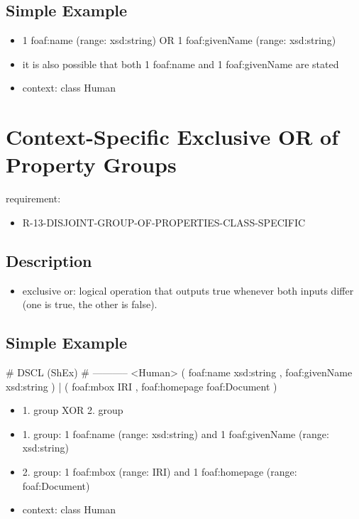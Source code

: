 \documentclass{llncs}
\begin{document}
\subsection{Simple Example}

\begin{itemize}
	\item 1 foaf:name (range: xsd:string) OR 1 foaf:givenName (range: xsd:string)
	\item it is also possible that both 1 foaf:name and 1 foaf:givenName are stated
	\item context: class Human
\end{itemize}

\section{Context-Specific Exclusive OR of Property Groups}

requirement:

\begin{itemize}
	\item R-13-DISJOINT-GROUP-OF-PROPERTIES-CLASS-SPECIFIC
\end{itemize}

\subsection{Description}

\begin{itemize}
	\item exclusive or: logical operation that outputs true whenever both inputs differ (one is true, the other is false).
\end{itemize}

\subsection{Simple Example}

\begin{ex}
# DSCL (ShEx)
# -----------
<Human> { 
    (  
        foaf:name xsd:string ,
        foaf:givenName xsd:string ) 
    |
    (
        foaf:mbox IRI ,
        foaf:homepage foaf:Document ) }
\end{ex}

\begin{itemize}
  \item 1. group XOR 2. group
	\item 1. group: 1 foaf:name (range: xsd:string) and 1 foaf:givenName (range: xsd:string)
	\item 2. group: 1 foaf:mbox (range: IRI) and 1 foaf:homepage (range: foaf:Document) 
	\item context: class Human
\end{itemize}
\end{document}
